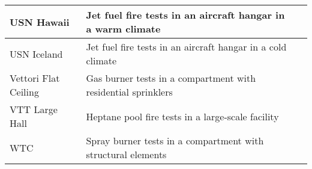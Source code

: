 \begin{table}[!ht]
\begin{center}
\begin{tabular}{|l|l|c|}
USN Hawaii            &  Jet fuel fire tests in an aircraft hangar in a warm climate    &  \cite{Gott:1}                              \\ \hline
USN Iceland           &  Jet fuel fire tests in an aircraft hangar in a cold climate    &  \cite{Gott:1}                              \\ \hline
Vettori Flat Ceiling  &  Gas burner tests in a compartment with residential sprinklers  &  \cite{Vettori:1}                           \\ \hline
VTT Large Hall        &  Heptane pool fire tests in a large-scale facility              &  \cite{Hostikka:VTT2104}                    \\ \hline
WTC                   &  Spray burner tests in a compartment with structural elements   &  \cite{NIST_NCSTAR_1-5B}                    \\ \hline
\end{tabular}
\end{center}
\label{tab:exp_data_sets}
\end{table}